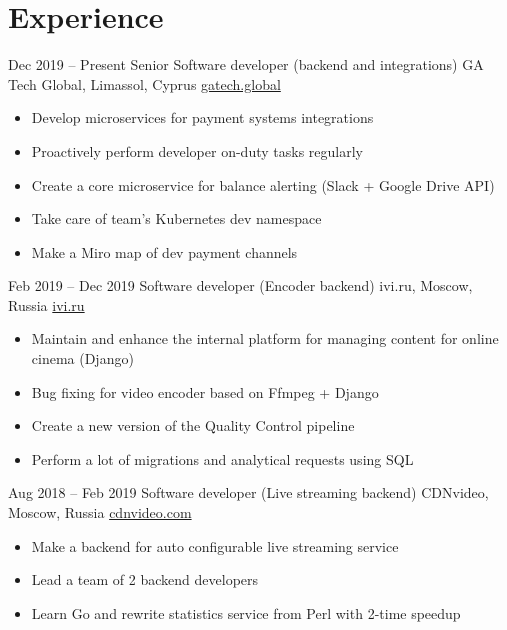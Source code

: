 \documentclass[11pt,a4paper]{moderncv}
\begin{document}
\maketitle
\vspace*{-5mm}

\section{Experience}
  \cventry
    {Dec 2019 – Present}
    {Senior Software developer (backend and integrations)}
    {GA Tech Global, Limassol, Cyprus}
    {\url{gatech.global}}
    {}
    {
      \begin{itemize}\setlength\itemindent{6pt}
        \item Develop microservices for payment systems integrations
        \item Proactively perform developer on-duty tasks regularly
        \item Create a core microservice for balance alerting (Slack + Google Drive API)
        \item Take care of team's Kubernetes dev namespace
        \item Make a Miro map of dev payment channels
      \end{itemize}
    }

  \cventry
    {Feb 2019 – Dec 2019}
    {Software developer (Encoder backend)}
    {ivi.ru, Moscow, Russia}
    {\url{ivi.ru}}
    {}
    {
      \begin{itemize}\setlength\itemindent{6pt}
        \item Maintain and enhance the internal platform for managing content for online cinema (Django)
        \item Bug fixing for video encoder based on Ffmpeg + Django
        \item Create a new version of the Quality Control pipeline
        \item Perform a lot of migrations and analytical requests using SQL
      \end{itemize}
    }

  \cventry
    {Aug 2018 – Feb 2019}
    {Software developer (Live streaming backend)}
    {CDNvideo, Moscow, Russia}
    {\url{cdnvideo.com}}
    {}
    {
      \begin{itemize}\setlength\itemindent{6pt}
        \item Make a backend for auto configurable live streaming service
        \item Lead a team of 2 backend developers
        \item Learn Go and rewrite statistics service from Perl with 2-time speedup
      \end{itemize}
    }
\end{document}
